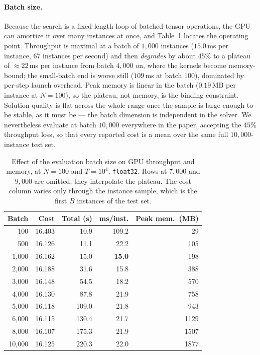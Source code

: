 \documentclass[letterpaper]{article} %
\begin{document}
\paragraph{Batch size.}
Because the search is a fixed-length loop of batched tensor operations, the GPU can amortize it over many instances at once, and Table~\ref{tab:batch} locates the operating point. Throughput is maximal at a batch of $1{,}000$ instances ($15.0$\,ms per instance, $67$ instances per second) and then \emph{degrades} by about $45\%$ to a plateau of $\approx 22$\,ms per instance from batch $4{,}000$ on, where the kernels become memory-bound; the small-batch end is worse still ($109$\,ms at batch $100$), dominated by per-step launch overhead. Peak memory is linear in the batch ($0.19$\,MB per instance at $N = 100$), so the plateau, not memory, is the binding constraint. Solution quality is flat across the whole range once the sample is large enough to be stable, as it must be --- the batch dimension is independent in the solver. We nevertheless evaluate at batch $10{,}000$ everywhere in the paper, accepting the $45\%$ throughput loss, so that every reported cost is a mean over the same full $10{,}000$-instance test set.

\begin{table}[t]
\centering
\small
\setlength{\tabcolsep}{6pt}
\begin{tabular}{@{}r r r r r@{}}
\toprule
Batch & Cost & Total (s) & ms/inst. & Peak mem.\ (MB) \\
\midrule
100      & 16.403 & 10.9  & 109.2 & 29 \\
500      & 16.126 & 11.1  & 22.2  & 105 \\
1{,}000  & 16.162 & 15.0  & \textbf{15.0} & 198 \\
2{,}000  & 16.188 & 31.6  & 15.8  & 388 \\
3{,}000  & 16.148 & 54.5  & 18.2  & 570 \\
4{,}000  & 16.130 & 87.8  & 21.9  & 758 \\
5{,}000  & 16.118 & 109.0 & 21.8  & 943 \\
6{,}000  & 16.115 & 130.4 & 21.7  & 1129 \\
8{,}000  & 16.107 & 175.3 & 21.9  & 1507 \\
10{,}000 & 16.125 & 220.3 & 22.0  & 1877 \\
\bottomrule
\end{tabular}
\caption{Effect of the evaluation batch size on GPU throughput and memory, at $N = 100$ and $T = 10^{4}$, \texttt{float32}. Rows at $7{,}000$ and $9{,}000$ are omitted; they interpolate the plateau. The cost column varies only through the instance sample, which is the first $B$ instances of the test set.}
\label{tab:batch}
\end{table}
\end{document}
